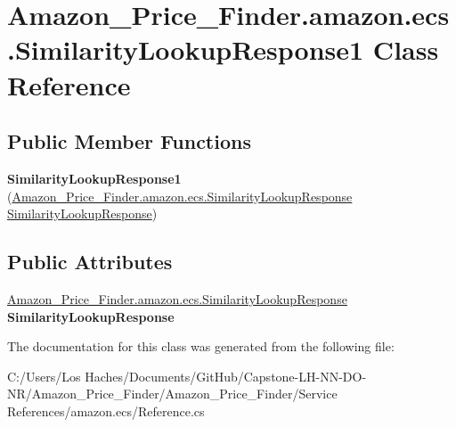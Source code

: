 \hypertarget{class_amazon___price___finder_1_1amazon_1_1ecs_1_1_similarity_lookup_response1}{\section{Amazon\-\_\-\-Price\-\_\-\-Finder.\-amazon.\-ecs.\-Similarity\-Lookup\-Response1 Class Reference}
\label{class_amazon___price___finder_1_1amazon_1_1ecs_1_1_similarity_lookup_response1}
}
\subsection*{Public Member Functions}
\begin{DoxyCompactItemize}
\item 
\hypertarget{class_amazon___price___finder_1_1amazon_1_1ecs_1_1_similarity_lookup_response1_abb3429bc18eec944f128b6e969a18ba0}{{\bfseries Similarity\-Lookup\-Response1} (\hyperlink{class_amazon___price___finder_1_1amazon_1_1ecs_1_1_similarity_lookup_response}{Amazon\-\_\-\-Price\-\_\-\-Finder.\-amazon.\-ecs.\-Similarity\-Lookup\-Response} \hyperlink{class_amazon___price___finder_1_1amazon_1_1ecs_1_1_similarity_lookup_response}{Similarity\-Lookup\-Response})}\label{class_amazon___price___finder_1_1amazon_1_1ecs_1_1_similarity_lookup_response1_abb3429bc18eec944f128b6e969a18ba0}

\end{DoxyCompactItemize}
\subsection*{Public Attributes}
\begin{DoxyCompactItemize}
\item 
\hypertarget{class_amazon___price___finder_1_1amazon_1_1ecs_1_1_similarity_lookup_response1_aa81dd389aa88ba86f801b49a1d275c4f}{\hyperlink{class_amazon___price___finder_1_1amazon_1_1ecs_1_1_similarity_lookup_response}{Amazon\-\_\-\-Price\-\_\-\-Finder.\-amazon.\-ecs.\-Similarity\-Lookup\-Response} {\bfseries Similarity\-Lookup\-Response}}\label{class_amazon___price___finder_1_1amazon_1_1ecs_1_1_similarity_lookup_response1_aa81dd389aa88ba86f801b49a1d275c4f}

\end{DoxyCompactItemize}


The documentation for this class was generated from the following file\-:\begin{DoxyCompactItemize}
\item 
C\-:/\-Users/\-Los Haches/\-Documents/\-Git\-Hub/\-Capstone-\/\-L\-H-\/\-N\-N-\/\-D\-O-\/\-N\-R/\-Amazon\-\_\-\-Price\-\_\-\-Finder/\-Amazon\-\_\-\-Price\-\_\-\-Finder/\-Service References/amazon.\-ecs/Reference.\-cs\end{DoxyCompactItemize}
